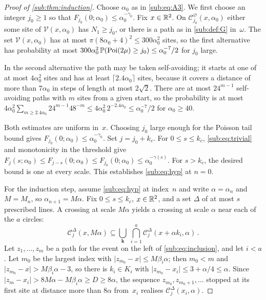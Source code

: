 \documentclass[11pt,letterpaper]{article}
\newcommand{\cC}{\mathcal C}
\begin{document}
\begin{proof}[Proof of \cref{sub:thm:induction}]
Choose $\alpha_0$ as in \eqref{sub:eq:A3}. We first choose an integer $j_0\ge1$ so that $F_{j_0}(0;\alpha_0)\le\alpha_0^{-\gamma_0}$. Fix $x\in\R^2$. On $\cC^{\varnothing}_{j_0}(x,\alpha_0)$ either some site of $\mathcal V(x,\alpha_0)$ has $N_1\ge j_0$, or there is a path as in \cref{sub:def:G} in~$\omega$. The set $\mathcal V(x,\alpha_0)$ has at most $\pi(8\alpha_0+4)^2\le300\alpha_0^2$ sites, so the first alternative has probability at most $300\alpha_0^2\,\P(\mathrm{Poi}(2\mu)\ge j_0)\le\alpha_0^{-7}/2$ for $j_0$ large.

In the second alternative the path may be taken self-avoiding; it starts at one of at most $4\alpha_0^2$ sites and has at least $\lceil2.4\alpha_0\rceil$ sites, because it covers a distance of more than $7\alpha_0$ in steps of length at most $2\sqrt2$. There are at most $24^{m-1}$ self-avoiding paths with $m$ sites from a given start, so the probability is at most $4\alpha_0^2\sum_{m\ge2.4\alpha_0}24^{m-1}48^{-m}\le4\alpha_0^2\,2^{-2.4\alpha_0}\le\alpha_0^{-7}/2$ for $\alpha_0\ge40$.

Both estimates are uniform in~$x$. Choosing $j_0$ large enough for the Poisson tail bound gives $F_{j_0}(0;\alpha_0)\le\alpha_0^{-\gamma_0}$. Set $j=j_0+k_c$. For $0\le s\le k_c$, \eqref{sub:eq:trivial} and monotonicity in the threshold give $F_j(s;\alpha_0)\le F_{j-s}(0;\alpha_0)\le F_{j_0}(0;\alpha_0)\le\alpha_0^{-\gamma(s)}$. For $s>k_c$, the desired bound is one at every scale. This establishes \eqref{sub:eq:hyp} at $n=0$.

For the induction step, assume \eqref{sub:eq:hyp} at index~$n$ and write $\alpha=\alpha_n$ and $M=M_n$, so $\alpha_{n+1}=M\alpha$. Fix $0\le s\le k_c$, $x\in\R^2$, and a set $\Delta$ of at most $s$ prescribed lines. A crossing at scale $M\alpha$ yields a crossing at scale $\alpha$ near each of the $a$ circles:
\begin{equation}\label{sub:eq:inclusion}
  \cC_j^{\Delta}(x,M\alpha)
    \subseteq\bigcup_{\boldsymbol k}\ \bigcap_{i=1}^a
      \cC_j^{\Delta}(x+\alpha k_i,\alpha)\,.
\end{equation}
Let $z_1,\dots,z_m$ be a path for the event on the left of \eqref{sub:eq:inclusion}, and let $i<a$. Let $m_0$ be the largest index with $\lvert z_{m_0}-x\rvert\le M\beta_i\alpha$; then $m_0<m$ and $\lvert z_{m_0}-x\rvert>M\beta_i\alpha-3$, so there is $k_i\in K_i$ with $\lvert z_{m_0}-x_i\rvert\le3+\alpha/4\le\alpha$. Since $\lvert z_m-x_i\rvert>8M\alpha-M\beta_i\alpha\ge D\ge8\alpha$, the sequence $z_{m_0},z_{m_0+1},\dots$ stopped at its first site at distance more than $8\alpha$ from~$x_i$ realises $\cC_j^{\Delta}(x_i,\alpha)$.


\end{proof}
\end{document}
